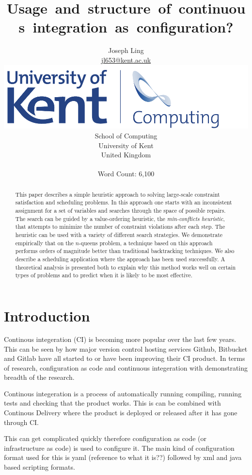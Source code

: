 \documentclass[twoside,12pt,titlepage,a4paper]{article}
\title{Usage and structure of continuous integration as configuration?}
\author{Joseph Ling\\\vspace{10mm}
\url{jl653@kent.ac.uk} \\ \vspace{5mm}
\includegraphics[scale=0.6]{Kent_Comp_294_RGB} \\
School of Computing \\
University of Kent \\
United Kingdom \\ \vspace{10mm} \\ Word Count: 6,100}
\begin{document}
\maketitle
\restoregeometry              %

\begin{abstract}
  This paper describes a simple heuristic approach to solving large-scale
  constraint satisfaction and scheduling problems.  In this approach one
  starts with an inconsistent assignment for a set of variables and
  searches through the space of possible repairs. The search can be guided
  by a value-ordering heuristic, the {\em min-conflicts heuristic}, that
  attempts to minimize the number of constraint violations after each
  step.  The heuristic can be used with a variety of different search
  strategies.  We demonstrate empirically that on the $n$-queens problem, 
  a technique
  based on this approach performs orders of magnitude better than
  traditional backtracking techniques.  We also describe a
  scheduling application where the approach has been used successfully.  A
  theoretical analysis is presented both to explain why this method works
  well on certain types of problems and to predict when it is likely to
  be most effective.
\end{abstract}

\section{Introduction}
\label{Introduction}

Continous integeration (CI) is becoming more popular over the last few years. This can be seen by how major version control hosting services Github, Bitbucket and Gitlab have all started to or have been improving their CI product. In terms of research, configuration as code \cite{Rahman2019} and continuous integeration \cite{Copeland2010} with \cite{Shahin2017} demonstrating breadth of the research.

Continous integeration is a process of automatically running compiling, running tests and checking that the product works. This is can be combined with Continous Delivery where the product is deployed or released after it has gone through CI. 

This can get complicated quickly therefore configuration as code (or infrastructure as code) is used to configure it. The main kind of configuration format used for this is yaml (reference to what it is??) followed by xml and java based scripting formats.
\end{document}
